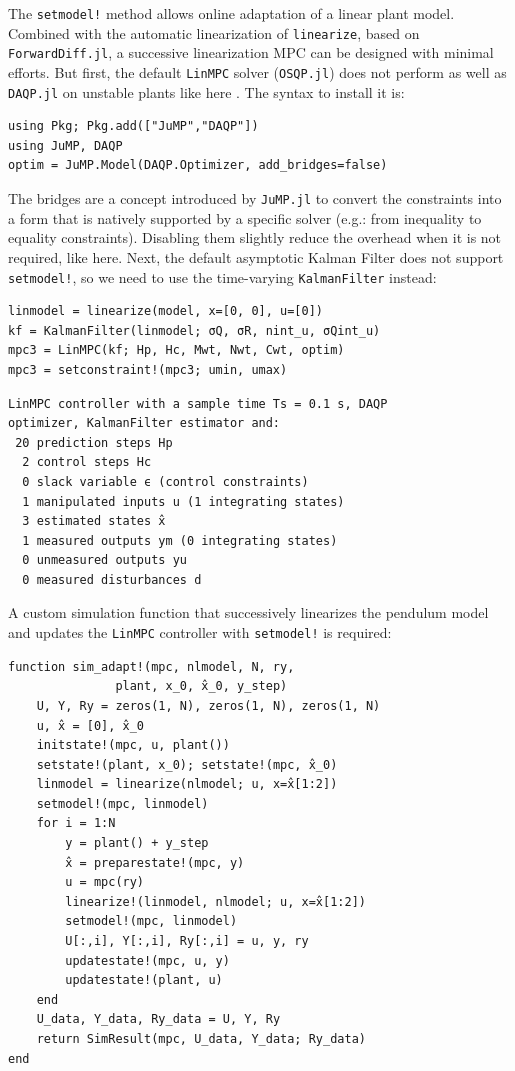 The \texttt{setmodel!} method allows online adaptation of a linear plant model. Combined with the automatic linearization of \texttt{linearize}, based on \texttt{ForwardDiff.jl}, a successive linearization MPC can be designed with minimal efforts. But first, the default \texttt{LinMPC} solver (\texttt{OSQP.jl}) does not perform as well as \texttt{DAQP.jl} on unstable plants like here \citep{daqp}. The syntax to install it is: 
\begin{verbatim}
using Pkg; Pkg.add(["JuMP","DAQP"])
using JuMP, DAQP
optim = JuMP.Model(DAQP.Optimizer, add_bridges=false)
\end{verbatim}
The bridges are a concept introduced by \texttt{JuMP.jl} to convert the constraints into a form that is natively supported by a specific solver (e.g.: from inequality to equality constraints). Disabling them slightly reduce the overhead when it is not required, like here. Next, the default asymptotic Kalman Filter does not support \texttt{setmodel!}, so we need to use the time-varying \texttt{KalmanFilter} instead:
\begin{verbatim}
linmodel = linearize(model, x=[0, 0], u=[0])
kf = KalmanFilter(linmodel; σQ, σR, nint_u, σQint_u)
mpc3 = LinMPC(kf; Hp, Hc, Mwt, Nwt, Cwt, optim)
mpc3 = setconstraint!(mpc3; umin, umax)
\end{verbatim}
\spacerepl
\begin{verbatim}
LinMPC controller with a sample time Ts = 0.1 s, DAQP
optimizer, KalmanFilter estimator and:
 20 prediction steps Hp
  2 control steps Hc
  0 slack variable ϵ (control constraints)
  1 manipulated inputs u (1 integrating states)
  3 estimated states x̂
  1 measured outputs ym (0 integrating states)
  0 unmeasured outputs yu
  0 measured disturbances d
\end{verbatim}
A custom simulation function that successively linearizes the pendulum model and updates the \texttt{LinMPC} controller with \texttt{setmodel!} is required: 
\begin{verbatim}
function sim_adapt!(mpc, nlmodel, N, ry, 
               plant, x_0, x̂_0, y_step)
    U, Y, Ry = zeros(1, N), zeros(1, N), zeros(1, N)
    u, x̂ = [0], x̂_0
    initstate!(mpc, u, plant())
    setstate!(plant, x_0); setstate!(mpc, x̂_0)
    linmodel = linearize(nlmodel; u, x=x̂[1:2])
    setmodel!(mpc, linmodel)
    for i = 1:N
        y = plant() + y_step
        x̂ = preparestate!(mpc, y)
        u = mpc(ry)
        linearize!(linmodel, nlmodel; u, x=x̂[1:2])
        setmodel!(mpc, linmodel) 
        U[:,i], Y[:,i], Ry[:,i] = u, y, ry
        updatestate!(mpc, u, y)
        updatestate!(plant, u)
    end
    U_data, Y_data, Ry_data = U, Y, Ry
    return SimResult(mpc, U_data, Y_data; Ry_data)
end
\end{verbatim}
